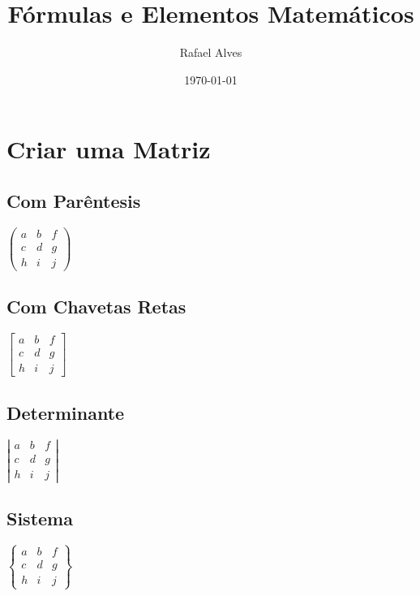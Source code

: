 \documentclass[12pt,a4paper,twoside]{report}
\title{Fórmulas e Elementos Matemáticos}
\author{Rafael Alves}
\date{\today}
\begin{document}
\maketitle

\section{Criar uma Matriz}
\subsection{Com Parêntesis}

$  %
\left(\begin{array}{ccc}
    a   &   b   &   f\\
    c   &   d   &   g\\
    h   &   i   &   j
\end{array}\right)
$

\subsection{Com Chavetas Retas}
$  %
\left[\begin{array}{ccc}
    a   &   b   &   f\\
    c   &   d   &   g\\
    h   &   i   &   j
\end{array}\right]
$

\subsection{Determinante}
$ 
\left|\begin{array}{ccc}
    a   &   b   &   f\\
    c   &   d   &   g\\
    h   &   i   &   j
\end{array}\right|
$

\subsection{Sistema}
\vspace{1cm}
$ 
\left\{\begin{array}{ccc}
    a   &   b   &   f\\
    c   &   d   &   g\\
    h   &   i   &   j
\end{array}\right\}
$
\vspace{1cm}
\end{document}
